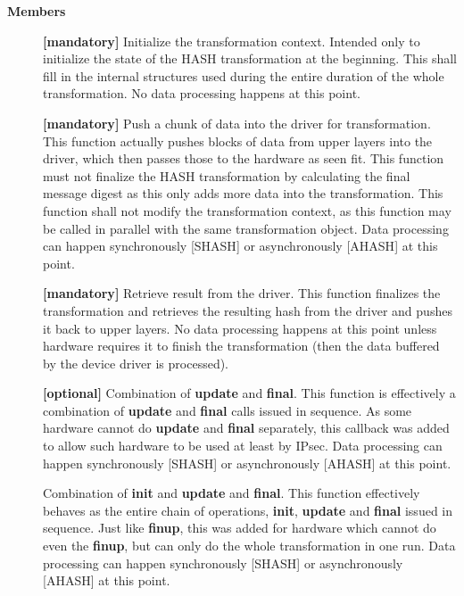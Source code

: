\documentclass[a4paper,8pt,english]{sphinxmanual}
\begin{document}
\textbf{Members}
\begin{description}
\item[{}] \leavevmode
\textbf{{[}mandatory{]}} Initialize the transformation context. Intended only to initialize the
state of the HASH transformation at the beginning. This shall fill in
the internal structures used during the entire duration of the whole
transformation. No data processing happens at this point.

\item[{}] \leavevmode
\textbf{{[}mandatory{]}} Push a chunk of data into the driver for transformation. This
function actually pushes blocks of data from upper layers into the
driver, which then passes those to the hardware as seen fit. This
function must not finalize the HASH transformation by calculating the
final message digest as this only adds more data into the
transformation. This function shall not modify the transformation
context, as this function may be called in parallel with the same
transformation object. Data processing can happen synchronously
{[}SHASH{]} or asynchronously {[}AHASH{]} at this point.

\item[{}] \leavevmode
\textbf{{[}mandatory{]}} Retrieve result from the driver. This function finalizes the
transformation and retrieves the resulting hash from the driver and
pushes it back to upper layers. No data processing happens at this
point unless hardware requires it to finish the transformation
(then the data buffered by the device driver is processed).

\item[{}] \leavevmode
\textbf{{[}optional{]}} Combination of \textbf{update} and \textbf{final}. This function is effectively a
combination of \textbf{update} and \textbf{final} calls issued in sequence. As some
hardware cannot do \textbf{update} and \textbf{final} separately, this callback was
added to allow such hardware to be used at least by IPsec. Data
processing can happen synchronously {[}SHASH{]} or asynchronously {[}AHASH{]}
at this point.

\item[{}] \leavevmode
Combination of \textbf{init} and \textbf{update} and \textbf{final}. This function
effectively behaves as the entire chain of operations, \textbf{init},
\textbf{update} and \textbf{final} issued in sequence. Just like \textbf{finup}, this was
added for hardware which cannot do even the \textbf{finup}, but can only do
the whole transformation in one run. Data processing can happen
synchronously {[}SHASH{]} or asynchronously {[}AHASH{]} at this point.


\end{description}
\end{document}
